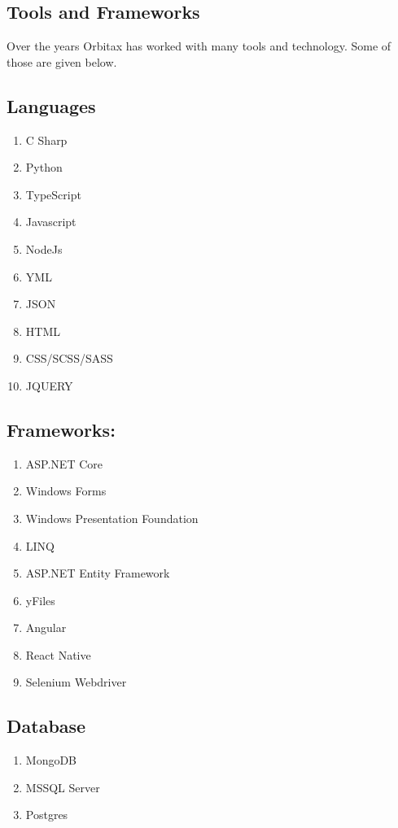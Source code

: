 \begin{flushleft}
\section{Tools and Frameworks}
Over the years Orbitax has worked with many tools and technology. Some of those are given below. 

\subsection{Languages}
\begin{enumerate}
	\item C Sharp
	\item Python
	\item TypeScript
	\item Javascript
	\item NodeJs
	\item YML
	\item JSON
	\item HTML
	\item CSS/SCSS/SASS
	\item JQUERY
\end{enumerate}

\subsection{Frameworks:}


\begin{enumerate}
	\item ASP.NET Core
	\item Windows Forms
	\item Windows Presentation Foundation
	\item LINQ
	\item ASP.NET Entity Framework
	\item yFiles
	\item Angular
	\item React Native
	\item Selenium Webdriver  
\end{enumerate}


\subsection{Database}


\begin{enumerate}
    \item MongoDB
    \item MSSQL Server
    \item Postgres
\end{enumerate}




\end{flushleft}
